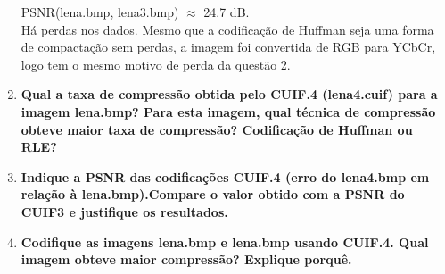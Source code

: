 \documentclass[12pt, a4paper, oneside]{abntex2}
\begin{document}
\begin{enumerate}
        PSNR(lena.bmp, lena3.bmp) $\approx$ 24.7 dB. \\
        Há perdas nos dados.
        Mesmo que a codificação de Huffman seja uma forma de compactação sem perdas, a imagem foi convertida de RGB para YCbCr, logo tem o mesmo motivo de perda da questão 2.

        \item \textbf{Qual a taxa de compressão obtida pelo CUIF.4 (lena4.cuif) para a imagem lena.bmp?
        Para esta imagem, qual técnica de compressão obteve maior taxa de compressão?
        Codificação de Huffman ou RLE?}

        \item \textbf{Indique a PSNR das codificações CUIF.4 (erro do lena4.bmp em relação à lena.bmp).Compare o valor obtido com a PSNR do CUIF3 e justifique os resultados.}

        \item \textbf{Codifique as imagens lena.bmp e lena.bmp usando CUIF.4. Qual imagem obteve maior compressão?
        Explique porquê.}


    \end{enumerate}
\end{document}
